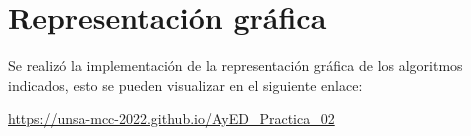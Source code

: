 \documentclass{article}
\begin{document}
    \section{Representación gráfica}\label{sec:representacion}
        Se realizó la implementación de la representación gráfica de los algoritmos indicados, esto se pueden visualizar en el siguiente enlace:\par
	    \par
	    \begin{center}
	        \url{https://unsa-mcc-2022.github.io/AyED_Practica_02}
	    \end{center}
	
		
	
\end{document}
